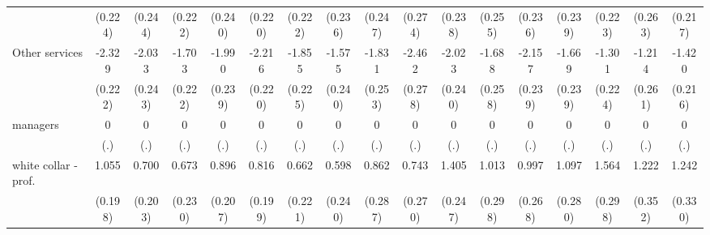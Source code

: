 {\begin{tabular}{l*{16}{c}}
                    &     (0.224)         &     (0.244)         &     (0.222)         &     (0.240)         &     (0.220)         &     (0.222)         &     (0.236)         &     (0.247)         &     (0.274)         &     (0.238)         &     (0.255)         &     (0.236)         &     (0.239)         &     (0.223)         &     (0.263)         &     (0.217)         \\
[1em]
Other services      &      -2.329\sym{***}&      -2.033\sym{***}&      -1.703\sym{***}&      -1.990\sym{***}&      -2.216\sym{***}&      -1.855\sym{***}&      -1.575\sym{***}&      -1.831\sym{***}&      -2.462\sym{***}&      -2.023\sym{***}&      -1.688\sym{***}&      -2.157\sym{***}&      -1.669\sym{***}&      -1.301\sym{***}&      -1.214\sym{***}&      -1.420\sym{***}\\
                    &     (0.222)         &     (0.243)         &     (0.222)         &     (0.239)         &     (0.220)         &     (0.225)         &     (0.240)         &     (0.253)         &     (0.278)         &     (0.240)         &     (0.258)         &     (0.239)         &     (0.239)         &     (0.224)         &     (0.261)         &     (0.216)         \\
[1em]
managers            &           0         &           0         &           0         &           0         &           0         &           0         &           0         &           0         &           0         &           0         &           0         &           0         &           0         &           0         &           0         &           0         \\
                    &         (.)         &         (.)         &         (.)         &         (.)         &         (.)         &         (.)         &         (.)         &         (.)         &         (.)         &         (.)         &         (.)         &         (.)         &         (.)         &         (.)         &         (.)         &         (.)         \\
[1em]
white collar - prof.&       1.055\sym{***}&       0.700\sym{***}&       0.673\sym{**} &       0.896\sym{***}&       0.816\sym{***}&       0.662\sym{**} &       0.598\sym{*}  &       0.862\sym{**} &       0.743\sym{**} &       1.405\sym{***}&       1.013\sym{***}&       0.997\sym{***}&       1.097\sym{***}&       1.564\sym{***}&       1.222\sym{***}&       1.242\sym{***}\\
                    &     (0.198)         &     (0.203)         &     (0.230)         &     (0.207)         &     (0.199)         &     (0.221)         &     (0.240)         &     (0.287)         &     (0.270)         &     (0.247)         &     (0.298)         &     (0.268)         &     (0.280)         &     (0.298)         &     (0.352)         &     (0.330)         \\

\end{tabular}}
